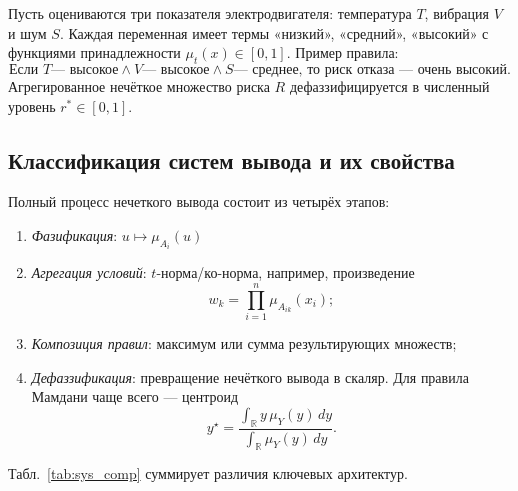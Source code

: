 \begin{example}
Пусть оцениваются три показателя электродвигателя: температура $T$, вибрация $V$ и шум $S$.  
Каждая переменная имеет термы «низкий», «средний», «высокий» с функциями принадлежности $\mu_{t}(x)\in[0,1]$.  
Пример правила:
\[
  \text{Если }T\text{— высокое}\land V\text{— высокое}\land S\text{— среднее,}
  \text{ то риск отказа — очень высокий}.
\]
Агрегированное нечёткое множество риска $R$ дефаззифицируется в численный уровень $r^*\in[0,1]$.
\end{example}




\subsection{Классификация систем вывода и их свойства}
\label{subsec:classification}

Полный процесс нечеткого вывода состоит из четырёх этапов:

\begin{enumerate}
  \item \emph{Фазификация}: $u\mapsto\mu_{A_i}(u)$
  \item \emph{Агрегация условий}: $t$-норма/ко-норма,
        например, произведение
        \begin{equation}
          w_k=\prod_{i=1}^{n}\mu_{A_{ik}}(x_i);
          \label{eq:tprod}
        \end{equation}
  \item \emph{Композиция правил}: максимум или сумма
        результирующих множеств;
  \item \emph{Дефаззификация}: превращение
        нечёткого вывода в скаляр.  
        Для правила Мамдани чаще всего —
        центроид
        \begin{equation}
          y^\star=\frac{\displaystyle
                     \int_{\mathbb R} y\,\mu_Y(y)\,dy}
                     {\displaystyle\int_{\mathbb R}\mu_Y(y)\,dy}.
          \label{eq:centroid}
        \end{equation}
\end{enumerate}

Табл.~\ref{tab:sys_comp} суммирует различия ключевых архитектур.

